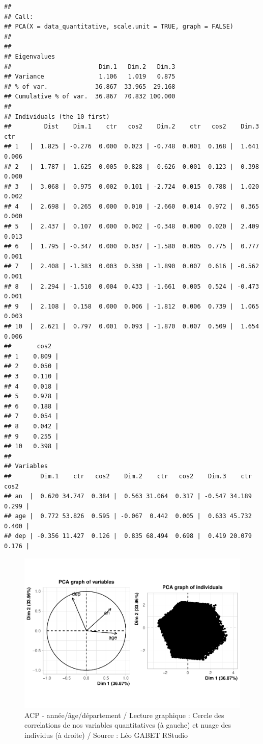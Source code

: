 \documentclass[french,]{compterendu}
\theoremstyle{urcastyle}
\theoremstyle{remark}
\begin{document}
\begin{verbatim}
## 
## Call:
## PCA(X = data_quantitative, scale.unit = TRUE, graph = FALSE) 
## 
## 
## Eigenvalues
##                        Dim.1   Dim.2   Dim.3
## Variance               1.106   1.019   0.875
## % of var.             36.867  33.965  29.168
## Cumulative % of var.  36.867  70.832 100.000
## 
## Individuals (the 10 first)
##         Dist    Dim.1    ctr   cos2    Dim.2    ctr   cos2    Dim.3    ctr
## 1   |  1.825 | -0.276  0.000  0.023 | -0.748  0.001  0.168 |  1.641  0.006
## 2   |  1.787 | -1.625  0.005  0.828 | -0.626  0.001  0.123 |  0.398  0.000
## 3   |  3.068 |  0.975  0.002  0.101 | -2.724  0.015  0.788 |  1.020  0.002
## 4   |  2.698 |  0.265  0.000  0.010 | -2.660  0.014  0.972 |  0.365  0.000
## 5   |  2.437 |  0.107  0.000  0.002 | -0.348  0.000  0.020 |  2.409  0.013
## 6   |  1.795 | -0.347  0.000  0.037 | -1.580  0.005  0.775 |  0.777  0.001
## 7   |  2.408 | -1.383  0.003  0.330 | -1.890  0.007  0.616 | -0.562  0.001
## 8   |  2.294 | -1.510  0.004  0.433 | -1.661  0.005  0.524 | -0.473  0.001
## 9   |  2.108 |  0.158  0.000  0.006 | -1.812  0.006  0.739 |  1.065  0.003
## 10  |  2.621 |  0.797  0.001  0.093 | -1.870  0.007  0.509 |  1.654  0.006
##       cos2  
## 1    0.809 |
## 2    0.050 |
## 3    0.110 |
## 4    0.018 |
## 5    0.978 |
## 6    0.188 |
## 7    0.054 |
## 8    0.042 |
## 9    0.255 |
## 10   0.398 |
## 
## Variables
##        Dim.1    ctr   cos2    Dim.2    ctr   cos2    Dim.3    ctr   cos2  
## an  |  0.620 34.747  0.384 |  0.563 31.064  0.317 | -0.547 34.189  0.299 |
## age |  0.772 53.826  0.595 | -0.067  0.442  0.005 |  0.633 45.732  0.400 |
## dep | -0.356 11.427  0.126 |  0.835 68.494  0.698 |  0.419 20.079  0.176 |
\end{verbatim}

\begin{figure}[H]

{\centering \includegraphics[width=0.9\linewidth]{Rapport_ADD_LEO-GABET_files/figure-latex/acp-1} 

}

\caption{ACP - année/âge/département / Lecture graphique : Cercle des correlations de nos variables quantitatives (à gauche) et nuage des individus (à droite) / Source : Léo GABET RStudio}\label{fig:acp}
\end{figure}
\end{document}
